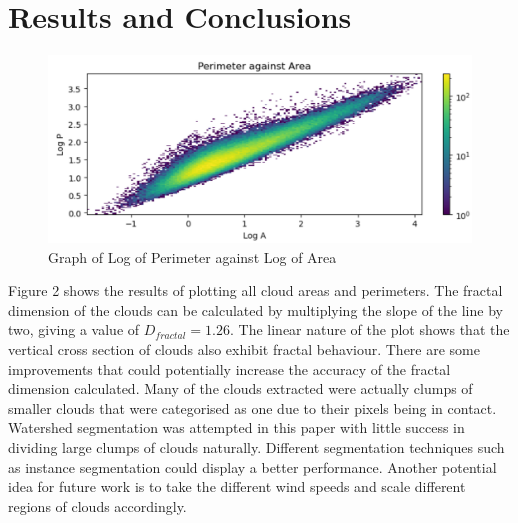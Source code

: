 \documentclass[titlepage]{article}
\begin{document}
\section{Results and Conclusions}

\begin{figure}[h]
    \centering
    \includegraphics[width=0.75\linewidth]{fig2.png}
    \caption{Graph of Log of Perimeter against Log of Area}
    \label{fig:enter-label}
\end{figure}

Figure 2 shows the results of plotting all cloud areas and perimeters. The fractal dimension of the clouds can be calculated by multiplying the slope of the line by two, giving a value of \(D_{fractal}=1.26\). The linear nature of the plot shows that the vertical cross section of clouds also exhibit fractal behaviour. There are some improvements that could potentially increase the accuracy of the fractal dimension calculated. Many of the clouds extracted were actually clumps of smaller clouds that were categorised as one due to their pixels being in contact. Watershed segmentation was attempted in this paper with little success in dividing large clumps of clouds naturally. Different segmentation techniques such as instance segmentation could display a better performance. Another potential idea for future work is to take the different wind speeds and scale different regions of clouds accordingly.



\end{document}
